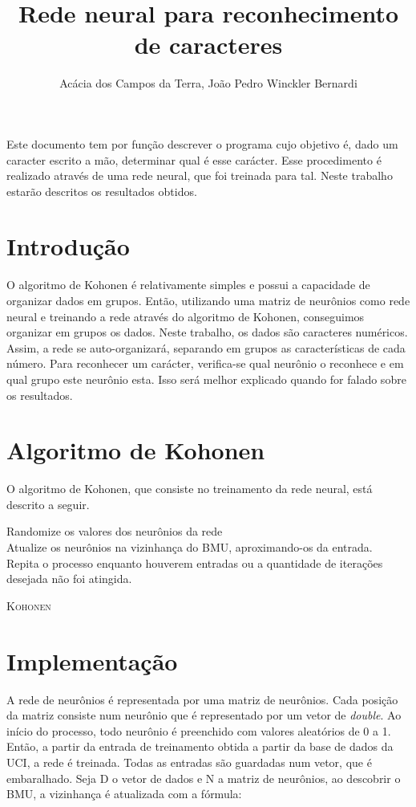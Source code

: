 \documentclass[12pt]{article}
\title{Rede neural para reconhecimento de caracteres}
\author{Acácia dos Campos da Terra, João Pedro Winckler Bernardi}
\begin{document}
\maketitle

\begin{resumo}
  Este documento tem por função descrever o programa cujo objetivo é,
  dado um caracter escrito a mão, determinar qual é esse carácter. Esse
  procedimento é realizado através de uma rede neural, que foi treinada
  para tal. Neste trabalho estarão descritos os resultados obtidos.
\end{resumo}


\section{Introdução}
O algoritmo de Kohonen é relativamente simples e possui a capacidade de
organizar dados em grupos. Então, utilizando uma matriz de neurônios
como rede neural e treinando a rede através do algoritmo de Kohonen,
conseguimos organizar em grupos os dados. Neste trabalho, os dados são
caracteres numéricos. Assim, a rede se auto-organizará, separando em
grupos as características de cada número. Para reconhecer um carácter,
verifica-se qual neurônio o reconhece e em qual grupo este neurônio
esta. Isso será melhor explicado quando for falado sobre os resultados.

\section{Algoritmo de Kohonen}
O algoritmo de Kohonen, que consiste no treinamento da rede neural, está
descrito a seguir.
\begin{algorithm}
    \SetAlgoLined
    Randomize os valores dos neurônios da rede\\
    Atualize os neurônios na vizinhança do BMU, aproximando-os da
    entrada.\\
    Repita o processo enquanto houverem entradas ou a quantidade de
    iterações desejada não foi atingida.
    \caption{\textsc{Kohonen}}
    \label{alg1}
\end{algorithm}

\section{Implementação}
A rede de neurônios é representada por uma matriz de neurônios. Cada
posição da matriz consiste num neurônio que é representado por um vetor
de \emph{double}. Ao início do processo, todo neurônio é preenchido com
valores aleatórios de 0 a 1. Então, a partir da entrada de treinamento
obtida a partir da base de dados da UCI, a rede é treinada. Todas as
entradas são guardadas num vetor, que é embaralhado. Seja D o vetor de
dados e N a matriz de neurônios, ao descobrir o BMU, a vizinhança é
atualizada com a fórmula:
\end{document}
